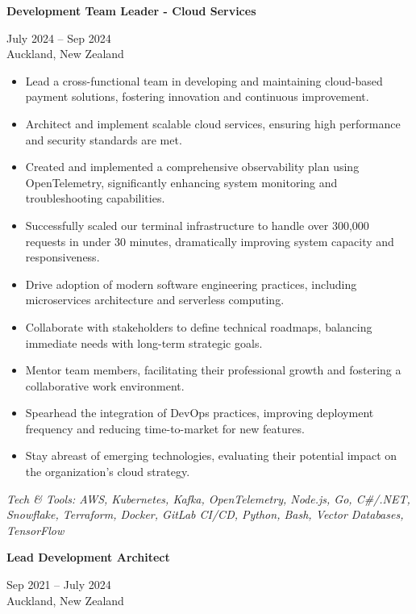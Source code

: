 \documentclass[10pt,a4paper,ragged2e,withhyper]{altacv}
\renewcommand{\cvevent}[4]{%
  \textbf{#1} %
  \hfill %
  \begin{minipage}[t]{.5\linewidth}
    \raggedleft %
    \small#3 %
    \\ %
    #4 %
  \end{minipage}
  \vspace{\baselineskip} %
}
\begin{document}
\cvevent{Development Team Leader - Cloud Services}{Invenco by GVR}{July 2024 -- Sep 2024}{Auckland, New Zealand}

\begin{itemize}
\item Lead a cross-functional team in developing and maintaining cloud-based payment solutions, fostering innovation and continuous improvement.
\item Architect and implement scalable cloud services, ensuring high performance and security standards are met.
\item Created and implemented a comprehensive observability plan using OpenTelemetry, significantly enhancing system monitoring and troubleshooting capabilities.
\item Successfully scaled our terminal infrastructure to handle over 300,000 requests in under 30 minutes, dramatically improving system capacity and responsiveness.
\item Drive adoption of modern software engineering practices, including microservices architecture and serverless computing.
\item Collaborate with stakeholders to define technical roadmaps, balancing immediate needs with long-term strategic goals.
\item Mentor team members, facilitating their professional growth and fostering a collaborative work environment.
\item Spearhead the integration of DevOps practices, improving deployment frequency and reducing time-to-market for new features.
\item Stay abreast of emerging technologies, evaluating their potential impact on the organization's cloud strategy.
\end{itemize}

\vspace{0.5cm}

\textit{Tech \& Tools: AWS, Kubernetes, Kafka, OpenTelemetry, Node.js, Go, C\#/.NET, Snowflake, Terraform, Docker, GitLab CI/CD, Python, Bash, Vector Databases, TensorFlow}

\divider


\cvevent{Lead Development Architect}{Idexx Laboratories}{Sep 2021 -- July 2024}{Auckland, New Zealand}
\end{document}
